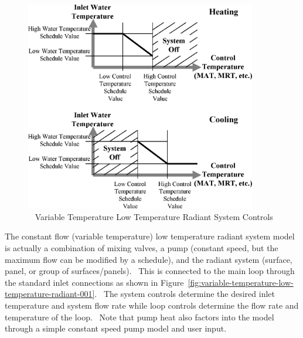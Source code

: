 \begin{figure}[hbtp] %
\centering
\includegraphics[width=0.9\textwidth, height=0.9\textheight, keepaspectratio=true]{media/image6054.png}
\caption{  Variable Temperature Low Temperature Radiant System Controls \protect \label{fig:variable-temperature-low-temperature-radiant}}
\end{figure}

The constant flow (variable temperature) low temperature radiant system model is actually a combination of mixing valves, a pump (constant speed, but the maximum flow can be modified by a schedule), and the radiant system (surface, panel, or group of surfaces/panels).~ This is connected to the main loop through the standard inlet connections as shown in Figure~\ref{fig:variable-temperature-low-temperature-radiant-001}.~ The system controls determine the desired inlet temperature and system flow rate while loop controls determine the flow rate and temperature of the loop.~ Note that pump heat also factors into the model through a simple constant speed pump model and user input.

